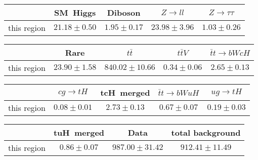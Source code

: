 \centering
\begin{tabular}{|c|c|c|c|c|} \hline
 & SM~Higgs & Diboson & $Z\to ll$ & $Z\to \tau\tau$\\\hline
this region & $21.18\pm0.50$ & $1.95\pm0.17$ & $23.98\pm3.96$ & $1.03\pm0.26$\\\hline
\end{tabular}
\begin{tabular}{|c|c|c|c|c|} \hline
 & Rare & $t\bar{t}$ & $t\bar{t}V$ & $\bar{t}t\to bWcH$\\\hline
this region & $23.90\pm1.58$ & $840.02\pm10.66$ & $0.34\pm0.06$ & $2.65\pm0.13$\\\hline
\end{tabular}
\begin{tabular}{|c|c|c|c|c|} \hline
 & $cg\to tH$ & tcH~merged & $\bar{t}t\to bWuH$ & $ug\to tH$\\\hline
this region & $0.08\pm0.01$ & $2.73\pm0.13$ & $0.67\pm0.07$ & $0.19\pm0.03$\\\hline
\end{tabular}
\begin{tabular}{|c|c|c|c|} \hline
 & tuH~merged & Data & total background\\\hline
this region & $0.86\pm0.07$ & $987.00\pm31.42$ & $912.41\pm11.49$\\\hline
\end{tabular}
